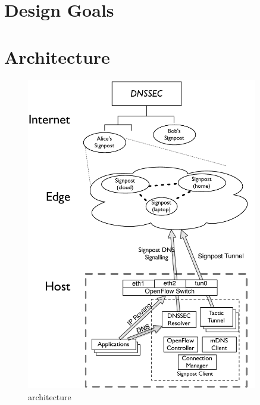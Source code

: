 \section{\signpost Design Goals} \label{sec:signpost-goals}

\section{\signpost Architecture}\label{sec:signpost-architecture}

\begin{figure}
  \begin{center}
	\includegraphics[width=0.9\textwidth]{signpost-arch}
  \end{center}
  \caption{\signpost architecture}
  \label{fig:signpost-arch}
\end{figure}

